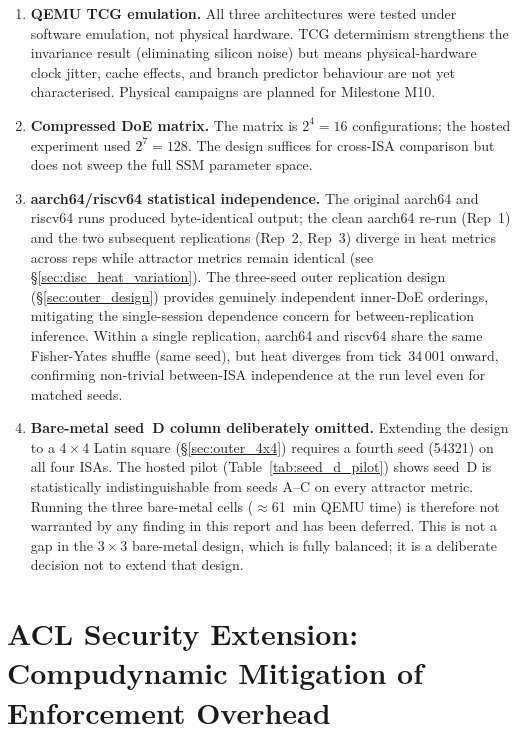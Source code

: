 \documentclass[10pt,a4paper]{article}
\begin{document}
\begin{enumerate}[noitemsep]
  \item \textbf{QEMU TCG emulation.}  All three architectures were tested
    under software emulation, not physical hardware.  TCG determinism
    strengthens the invariance result (eliminating silicon noise) but means
    physical-hardware clock jitter, cache effects, and branch predictor
    behaviour are not yet characterised.  Physical campaigns are planned for
    Milestone M10.
  \item \textbf{Compressed DoE matrix.}  The matrix is $2^4 = 16$
    configurations; the hosted experiment used $2^7 = 128$.  The design
    suffices for cross-ISA comparison but does not sweep the full SSM
    parameter space.
  \item \textbf{aarch64/riscv64 statistical independence.}  The original
    aarch64 and riscv64 runs produced byte-identical output; the clean
    aarch64 re-run (Rep~1) and the two subsequent replications (Rep~2,
    Rep~3) diverge in heat metrics across reps while attractor metrics
    remain identical (see \S\ref{sec:disc_heat_variation}).  The three-seed
    outer replication design (\S\ref{sec:outer_design}) provides genuinely
    independent inner-DoE orderings, mitigating the single-session dependence
    concern for between-replication inference.  Within a single replication,
    aarch64 and riscv64 share the same Fisher-Yates shuffle (same seed), but
    heat diverges from tick~34\,001 onward, confirming non-trivial between-ISA
    independence at the run level even for matched seeds.
  \item \textbf{Bare-metal seed~D column deliberately omitted.}  Extending
    the design to a $4\times4$ Latin square (§\ref{sec:outer_4x4}) requires
    a fourth seed (54321) on all four ISAs.  The hosted pilot
    (Table~\ref{tab:seed_d_pilot}) shows seed~D is statistically
    indistinguishable from seeds A--C on every attractor metric.
    Running the three bare-metal cells ($\approx$61~min QEMU time) is
    therefore not warranted by any finding in this report and has been
    deferred.  This is not a gap in the $3\times3$ bare-metal design, which
    is fully balanced; it is a deliberate decision not to extend that design.
\end{enumerate}

\section{ACL Security Extension: Compudynamic Mitigation of Enforcement Overhead}
\label{sec:acl}
\end{document}
